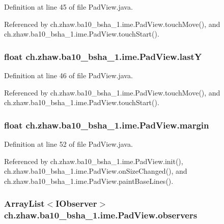 Definition at line 45 of file PadView.java.

Referenced by ch.zhaw.ba10\_\-bsha\_\-1.ime.PadView.touchMove(), and ch.zhaw.ba10\_\-bsha\_\-1.ime.PadView.touchStart().\hypertarget{classch_1_1zhaw_1_1ba10__bsha__1_1_1ime_1_1PadView_a2e3aa9d507464cf235778e66baea84a0}{
\subsubsection[{lastY}]{\setlength{\rightskip}{0pt plus 5cm}float {\bf ch.zhaw.ba10\_\-bsha\_\-1.ime.PadView.lastY}}}
\label{classch_1_1zhaw_1_1ba10__bsha__1_1_1ime_1_1PadView_a2e3aa9d507464cf235778e66baea84a0}


Definition at line 46 of file PadView.java.

Referenced by ch.zhaw.ba10\_\-bsha\_\-1.ime.PadView.touchMove(), and ch.zhaw.ba10\_\-bsha\_\-1.ime.PadView.touchStart().\hypertarget{classch_1_1zhaw_1_1ba10__bsha__1_1_1ime_1_1PadView_af25e748299c5bc4816c615f180306695}{
\subsubsection[{margin}]{\setlength{\rightskip}{0pt plus 5cm}float {\bf ch.zhaw.ba10\_\-bsha\_\-1.ime.PadView.margin}}}
\label{classch_1_1zhaw_1_1ba10__bsha__1_1_1ime_1_1PadView_af25e748299c5bc4816c615f180306695}


Definition at line 52 of file PadView.java.

Referenced by ch.zhaw.ba10\_\-bsha\_\-1.ime.PadView.init(), ch.zhaw.ba10\_\-bsha\_\-1.ime.PadView.onSizeChanged(), and ch.zhaw.ba10\_\-bsha\_\-1.ime.PadView.paintBaseLines().\hypertarget{classch_1_1zhaw_1_1ba10__bsha__1_1_1ime_1_1PadView_acb98feb9db4b3995ee755d986679428d}{
\subsubsection[{observers}]{\setlength{\rightskip}{0pt plus 5cm}ArrayList$<${\bf IObserver}$>$ {\bf ch.zhaw.ba10\_\-bsha\_\-1.ime.PadView.observers}}}
\label{classch_1_1zhaw_1_1ba10__bsha__1_1_1ime_1_1PadView_acb98feb9db4b3995ee755d986679428d}


